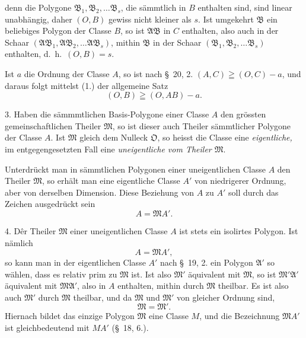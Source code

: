 \documentclass{article}
\begin{document}
denn die Polygone $\mathfrak{B}_{1}, \mathfrak{B}_{2}, \ldots \mathfrak{B}_{s}$, die sämmtlich in $B$ enthalten sind, sind linear unabhängig, daher $(O, B)$ gewiss nicht kleiner als $s$. Ist umgekehrt $\mathfrak{B}$ ein beliebiges Polygon der Classe $B$, so ist $\mathfrak{A}\mathfrak{B}$ in $C$ enthalten, also auch in der Schaar $(\mathfrak{A}\mathfrak{B}_{1}, \mathfrak{A}\mathfrak{B}_{2}, \ldots \mathfrak{A}\mathfrak{B}_{s})$, mithin $\mathfrak{B}$ in der Schaar $(\mathfrak{B}_{1}, \mathfrak{B}_{2}, \ldots \mathfrak{B}_{s})$ enthalten, d.\ h.\ $(O, B) = s$.

Ist $a$ die Ordnung der Classe $A$, so ist nach §~20, 2. $(A, C) \geqq (O, C) - a$, und daraus folgt mittelst (1.) der allgemeine Satz
\[ (O, B) \geqq (O, AB) - a. \tag{2.} \]

3. Haben die sämmmtlichen Basis-Polygone einer Classe $A$ den grössten gemeinschaftlichen Theiler $\mathfrak{M}$, so ist dieser auch Theiler sämmtlicher Polygone der Classe $A$. Ist $\mathfrak{M}$ gleich dem Nulleck $\mathfrak{O}$, so heisst die Classe eine \emph{eigentliche,} im entgegengesetzten Fall eine \emph{uneigentliche vom Theiler $\mathfrak{M}$}.

Unterdrückt man in sämmtlichen Polygonen einer uneigentlichen Classe $A$ den Theiler $\mathfrak{M}$, so erhält man eine eigentliche Classe $A'$ von niedrigerer Ordnung, aber von derselben Dimension. Diese Beziehung von $A$ zu $A'$ soll durch das Zeichen ausgedrückt sein
\[ A = \mathfrak{M}A'. \]

4. Dêr Theiler $\mathfrak{M}$ einer uneigentlichen Classe $A$ ist stets ein isolirtes Polygon. Ist nämlich
\[ A = \mathfrak{M}A', \]
so kann man in der eigentlichen Classe $A'$ nach §~19, 2. ein Polygon $\mathfrak{A}'$ so wählen, dass es relativ prim zu $\mathfrak{M}$ ist. Ist also $\mathfrak{M}'$ äquivalent mit $\mathfrak{M}$, so ist $\mathfrak{M}'\mathfrak{A}'$ äquivalent mit $\mathfrak{M}\mathfrak{A}'$, also in $A$ enthalten, mithin durch $\mathfrak{M}$ theilbar. Es ist also auch $\mathfrak{M}'$ durch $\mathfrak{M}$ theilbar, und da $\mathfrak{M}$ und $\mathfrak{M}'$ von gleicher Ordnung sind,
\[ \mathfrak{M} = \mathfrak{M}'. \]
Hiernach bildet das einzige Polygon $\mathfrak{M}$ eine Classe $M$, und die Bezeichnung $\mathfrak{M}A'$ ist gleichbedeutend mit $MA'$ (§~18, 6.).
\end{document}
